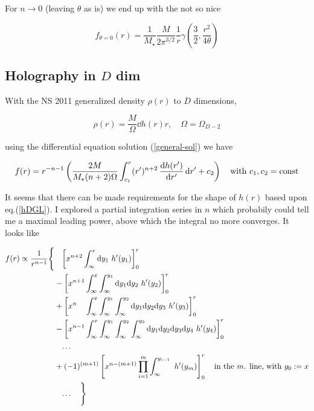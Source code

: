 \documentclass[10pt,a4paper, fleqn]{article}
\begin{document}
For $n\to 0$ (leaving $\theta$ as is) we end up with the not so nice

\begin{equation}
f_{\theta=0}(r) = \frac{1}{M_\star} \frac{M}{2 \pi^{3/2}} \frac{1}{r} \gamma \left( \frac{3}{2}, \frac{r^2}{4\theta}\right)
\end{equation}


\subsection{Holography in $D$ dim}

With the NS 2011 generalized density $\rho(r)$ to $D$ dimensions,

\begin{equation}
\rho(r) = \frac{M}{\Omega} \dd{h(r)}{r}, \quad \Omega = \Omega_{D-2}
\end{equation}

using the differential equation solution (\ref{general-sol}) we have

\begin{equation}
f(r) = r^{-n-1} \left(\frac{2 M }{M_\star (n+2) \Omega } \int_{c_1}^r  (r')^{n+2} \,\frac{\mathrm{d} h(r')}{\mathrm{d} r'} \, \mathrm{d} r'+c_2 \right) \quad\text{with }c_1, c_2 = \text{const} \label{hDGL}
\end{equation}

It seems that there can be made requirements for the shape of $h(r)$ based upon eq.(\ref{hDGL}). I explored a partial integration series in $n$ which probabily could tell me a maximal leading power, above which the integral no more converges. It looks like

\begin{equation} \label{partiell}
\begin{aligned}
f(r) \propto \frac{1}{r^{n-1}} \Bigg\{
	&\phantom{+} \left[ x^{n+2} \int_\infty^x  \mathrm{d} y_1 ~h'(y_1)  \right]_0^r \\
	&- \left[ x^{n+1} \int_\infty^x \int_\infty^{y_1} \mathrm{d} y_1 \mathrm{d} y_2 ~h'(y_2)  \right]_0^r \\
    &+ \left[ x^{n\phantom{+0}} \int_\infty^x \int_\infty^{y_1} \int_\infty^{y_2} \mathrm{d} y_1 \mathrm{d} y_2 \mathrm{d} y_3 ~h'(y_3)  \right]_0^r  \\
    &- \left[ x^{n-1} \int_\infty^x \int_\infty^{y_1} \int_\infty^{y_2} \int_\infty^{y_3} \mathrm{d} y_1 \mathrm{d} y_2 \mathrm{d} y_3 \mathrm{d} y_4 ~h'(y_4)  \right]_0^r  \\
    &\phantom{+} \dots \\
    &+ (-1)^{(m+1)} \left[ x^{n-(m+1)} \prod_{i=1}^m  \int_\infty^{y_{i-1}} ~ h'(y_m)   \right]_0^r
    \quad \text{in the $m$. line, with $y_0:=x$} \\
    &\phantom{+} \dots \quad 
  \Bigg\}
\end{aligned}
\end{equation}
\end{document}
